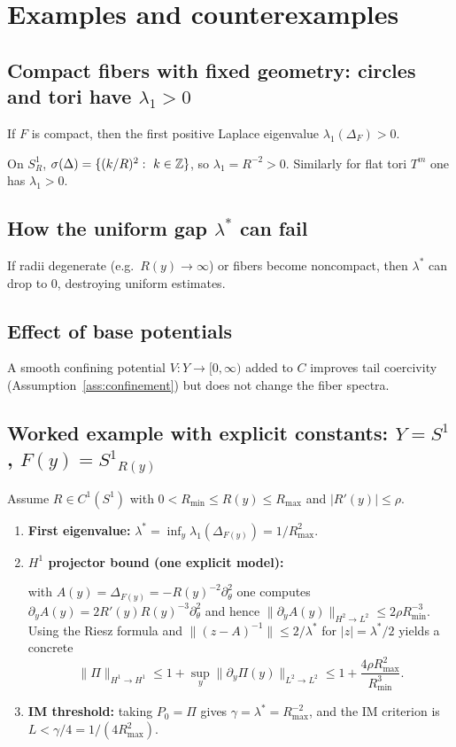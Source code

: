 \documentclass[11pt]{article}
\providecommand{\Aop}{A}
\providecommand{\spec}{\sigma}
\providecommand{\FPpdf}[2]{\texorpdfstring{#1}{#2}}
\providecommand{\lamstar}{\ensuremath{\lambda^{\ast}}}
\providecommand{\lamone}{\ensuremath{\lambda_{1}}}
\providecommand{\Sone}{\ensuremath{S^{1}}}
\begin{document}
\section{Examples and counterexamples}

\subsection{Compact fibers with fixed geometry: circles and tori have \FPpdf{$\lamone>0$}{lambda1>0}}
\begin{proposition}
If $F$ is compact, then the first positive Laplace eigenvalue $\lambda_1(\Delta_F)>0$.
\end{proposition}

\begin{corollary}
On $S^1_R$, $\spec(\Delta)=\{(k/R)^2:\ k\in\bbZ\}$, so $\lambda_1=R^{-2}>0$.
Similarly for flat tori $T^m$ one has $\lambda_1>0$.
\end{corollary}

\subsection{How the uniform gap \FPpdf{$\lamstar$}{lambda*} can fail}
If radii degenerate (e.g.\ $R(y)\to\infty$) or fibers become noncompact, then $\lamstar$ can drop to $0$, destroying uniform estimates.

\subsection{Effect of base potentials}
A smooth confining potential $V:Y\to[0,\infty)$ added to $C$ improves tail coercivity (Assumption~\ref{ass:confinement}) but does not change the fiber spectra.

\subsection{Worked example with explicit constants: \FPpdf{$Y=\Sone$}{Y=S1}, \FPpdf{$F(y)=\Sone_{R(y)}$}{F(y)=S1(R(y))}}
Assume $R\in C^1(S^1)$ with $0<R_{\min}\le R(y)\le R_{\max}$ and $|R'(y)|\le \rho$.
\begin{enumerate}[label=\textup{(\alph*)}]
\item \textbf{First eigenvalue:} $\lamstar=\inf_y \lambda_1(\Delta_{F(y)}) = 1/R_{\max}^2$.
\item \textbf{$H^1$ projector bound (one explicit model):}

with $\Aop(y)=\Delta_{F(y)}=-R(y)^{-2}\partial_\theta^2$ one computes
$\partial_y \Aop(y)= 2R'(y)R(y)^{-3}\partial_\theta^2$ and hence
$\|\partial_y \Aop(y)\|_{H^2\to L^2}\le 2\rho R_{\min}^{-3}$.
Using the Riesz formula and $\|(z-\Aop)^{-1}\|\le 2/\lamstar$ for $|z|=\lamstar/2$ yields a concrete
\[
\|\Pi\|_{H^1\to H^1}\le 1+\sup_y \|\partial_y\Pi(y)\|_{L^2\to L^2}
\le 1+\frac{4\rho R_{\max}^2}{R_{\min}^3}.
\]
\item \textbf{IM threshold:} taking $P_0=\Pi$ gives $\gamma=\lamstar=R_{\max}^{-2}$, and the IM criterion is $L<\gamma/4 = 1/(4R_{\max}^2)$.
\end{enumerate}
\end{document}
